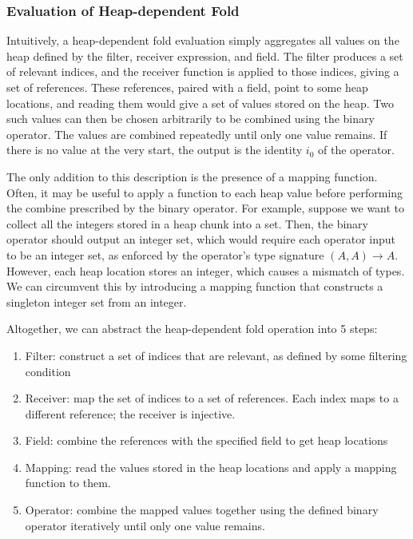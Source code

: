 \documentclass[msc,oneside]{ubcthesis}
\begin{document}
\subsubsection{Evaluation of Heap-dependent Fold}
Intuitively, a heap-dependent fold evaluation simply aggregates all values on the heap defined by the filter, receiver expression, and field. The filter produces a set of relevant indices, and the receiver function is applied to those indices, giving a set of references. These references, paired with a field, point to some heap locations, and reading them would give a set of values stored on the heap. Two such values can then be chosen arbitrarily to be combined using the binary operator. The values are combined repeatedly until only one value remains. If there is no value at the very start, the output is the identity $i_0$ of the operator. 

The only addition to this description is the presence of a mapping function. Often, it may be useful to apply a function to each heap value before performing the combine prescribed by the binary operator. For example, suppose we want to collect all the integers stored in a heap chunk into a set. Then, the binary operator should output an integer set, which would require each operator input to be an integer set, as enforced by the operator's type signature $(A, A) \rightarrow A$. However, each heap location stores an integer, which causes a mismatch of types. We can circumvent this by introducing a mapping function that constructs a singleton integer set from an integer.

Altogether, we can abstract the heap-dependent fold operation into 5 steps:
\begin{enumerate}
    \item Filter: construct a set of indices that are relevant, as defined by some filtering condition
    \item Receiver: map the set of indices to a set of references. Each index maps to a different reference; the receiver is injective.
    \item Field: combine the references with the specified field to get heap locations
    \item Mapping: read the values stored in the heap locations and apply a mapping function to them.
    \item Operator: combine the mapped values together using the defined binary operator iteratively until only one value remains.
\end{enumerate}
\end{document}
